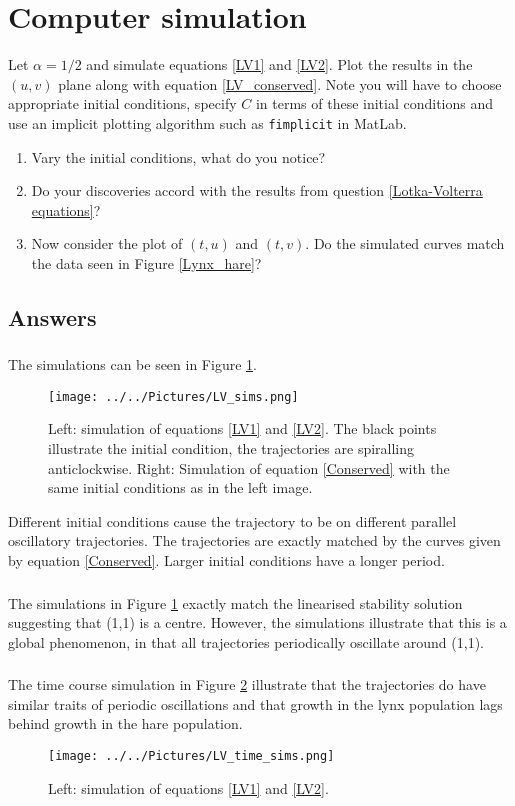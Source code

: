 \documentclass[]{article}
\newcommand{\fig}[1]{Figure \ref{#1}}
\newcommand{\eqn}[1]{equation \eqref{#1}}
\newcommand{\eqns}[2]{equations \eqref{#1} and \eqref{#2}}
\newcommand{\tttp}{.32\textwidth}
\begin{document}
\section{Computer simulation}
Let $\alpha=1/2$ and simulate \eqns{LV1}{LV2}. Plot the results in the $(u,v)$ plane along with \eqn{LV_conserved}. Note you will have to choose appropriate initial conditions, specify $C$ in terms of these initial conditions and use an implicit plotting algorithm such as \texttt{fimplicit} in MatLab.
\begin{enumerate}
\item Vary the initial conditions, what do you notice?
\item Do your discoveries accord with the results from question \ref{Lotka-Volterra equations}?
\item Now consider the plot of $(t,u)$ and $(t,v)$. Do the simulated curves match the data seen in \fig{Lynx_hare}?
\end{enumerate}
\begin{Answ}
\subsection{Answers}
\subsubsection{}
The simulations can be seen in \fig{LV_sims}.
\begin{figure}[h!!!tb]
\centering
\texttt{[image: ../../Pictures/LV\_sims.png]}
\caption{Left: simulation of \eqns{LV1}{LV2}. The black points illustrate the initial condition, the trajectories are spiralling anticlockwise. Right: Simulation of \eqn{Conserved} with the same initial conditions as in the left image.\label{LV_sims}}
\end{figure}
Different initial conditions cause the trajectory to be on different parallel oscillatory trajectories. The trajectories are exactly matched by the curves given by \eqn{Conserved}. Larger initial conditions have a longer period.

\subsubsection{}
The simulations in \fig{LV_sims} exactly match the linearised stability solution suggesting that (1,1) is a centre. However, the simulations illustrate that this is a global phenomenon, in that all trajectories periodically oscillate around (1,1).
\subsubsection{}
The time course simulation in \fig{LV_time_sims} illustrate that the trajectories do have similar traits of periodic oscillations and that growth in the lynx population lags behind growth in the  hare population.
\begin{figure}[h!!!tb]
\centering
\texttt{[image: ../../Pictures/LV\_time\_sims.png]}
\caption{Left: simulation of \eqns{LV1}{LV2}.\label{LV_time_sims}}
\end{figure}
\end{Answ}
\end{document}
